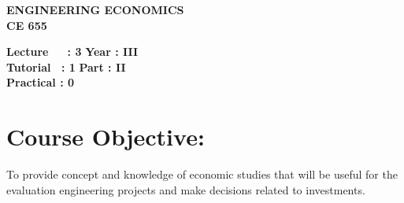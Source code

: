 \begin{center}
    \textbf{\huge{\uppercase{Engineering Economics}}}
    \\
    \vspace{.5cm}
    \textbf{\large{CE 655}}
\end{center}

\noindent\textbf{Lecture\ \ \ : 3} \hfill \textbf{Year : III} \\
\textbf{Tutorial \ : 1} \hfill \textbf{Part : II } \\
\textbf{Practical : 0}  \\

\par
\noindent 
\section*{Course Objective:}
To provide concept and knowledge of economic studies that will be useful for the evaluation engineering projects and make decisions related to investments.

